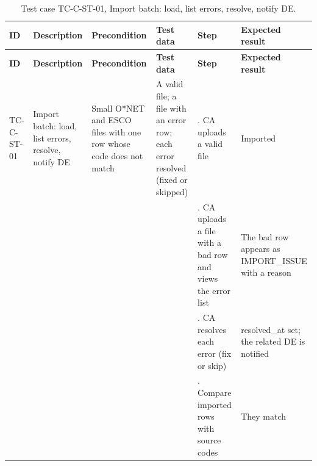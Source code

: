 {\footnotesize{}\renewcommand{\arraystretch}{1.1}
\begin{longtable}{|>{\raggedright\arraybackslash}p{}|>{\raggedright\arraybackslash}p{}|>{\raggedright\arraybackslash}p{}|>{\raggedright\arraybackslash}p{}|>{\raggedright\arraybackslash}p{}|>{\raggedright\arraybackslash}p{}|}
\caption{Test case TC-C-ST-01, Import batch: load, list errors, resolve, notify DE.} \\
\hline
\textbf{ID} & \textbf{Description} & \textbf{Precondition} & \textbf{Test data} & \textbf{Step} & \textbf{Expected result} \\ \hline
\endfirsthead
\hline
\textbf{ID} & \textbf{Description} & \textbf{Precondition} & \textbf{Test data} & \textbf{Step} & \textbf{Expected result} \\ \hline
\endhead
TC-C-ST-01 & Import batch: load, list errors, resolve, notify DE & Small O*NET and ESCO files with one row whose code does not match & A valid file; a file with an error row; each error resolved (fixed or skipped) & 1. CA uploads a valid file & Imported \\ \cline{5-6}
 &  &  &  & 2. CA uploads a file with a bad row and views the error list & The bad row appears as IMPORT\_\allowbreak{}ISSUE with a reason \\ \cline{5-6}
 &  &  &  & 3. CA resolves each error (fix or skip) & resolved\_at set; the related DE is notified \\ \cline{5-6}
 &  &  &  & 4. Compare imported rows with source codes & They match \\ \hline
\end{longtable}
}

